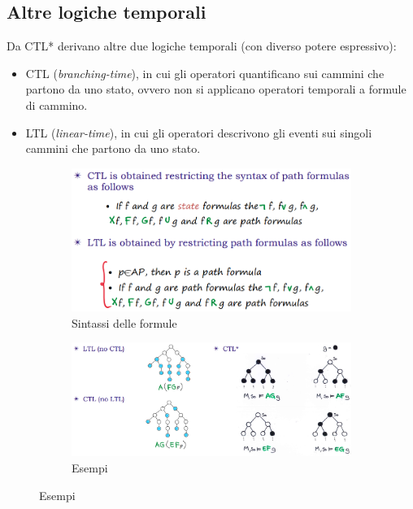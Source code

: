 \documentclass[a4paper,oneside,titlepage]{book}
\begin{document}
\subsection{Altre logiche temporali}
Da CTL* derivano altre due logiche temporali (con diverso potere espressivo):
\begin{itemize}
    \item CTL (\textit{branching-time}), in cui gli operatori quantificano sui cammini che partono da uno stato, ovvero non si applicano operatori temporali a formule di cammino.
    \item LTL (\textit{linear-time}), in cui gli operatori descrivono gli eventi sui singoli cammini che partono da uno stato.
\end{itemize}
\begin{figure}[htp]
	\begin{subfigure}{0.49\textwidth}
	    \centering
		\includegraphics[width=\textwidth, height=\textheight, keepaspectratio]{ctl6.png}
		\caption{Sintassi delle formule}
	\end{subfigure}
	\hfill
	\begin{subfigure}{0.49\textwidth}
	    \centering
		\includegraphics[width=\textwidth, height=\textheight, keepaspectratio]{ctl7.png}
		\caption{Esempi}
	\end{subfigure}
\end{figure}
\end{document}
